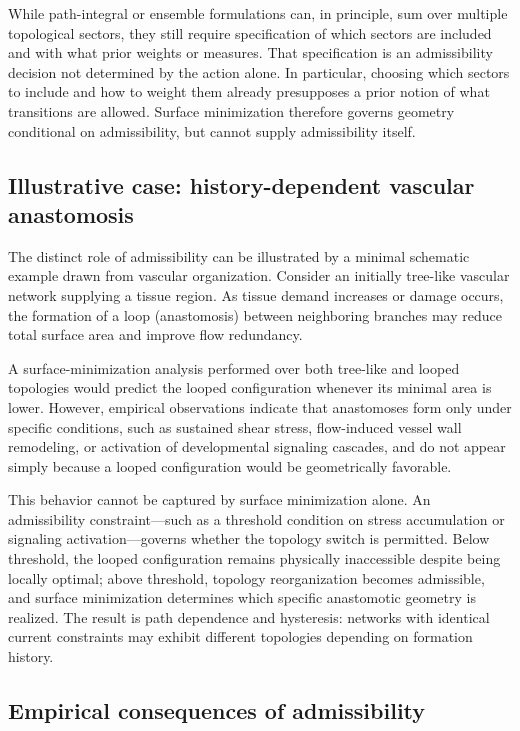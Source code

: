 While path-integral or ensemble formulations can, in principle, sum over multiple topological sectors, they still require specification of which sectors are included and with what prior weights or measures. That specification is an admissibility decision not determined by the action alone. In particular, choosing which sectors to include and how to weight them already presupposes a prior notion of what transitions are allowed. Surface minimization therefore governs geometry conditional on admissibility, but cannot supply admissibility itself.

\subsection{Illustrative case: history-dependent vascular anastomosis}

The distinct role of admissibility can be illustrated by a minimal schematic example drawn from vascular organization. Consider an initially tree-like vascular network supplying a tissue region. As tissue demand increases or damage occurs, the formation of a loop (anastomosis) between neighboring branches may reduce total surface area and improve flow redundancy.

A surface-minimization analysis performed over both tree-like and looped topologies would predict the looped configuration whenever its minimal area is lower. However, empirical observations indicate that anastomoses form only under specific conditions, such as sustained shear stress, flow-induced vessel wall remodeling, or activation of developmental signaling cascades, and do not appear simply because a looped configuration would be geometrically favorable.\cite{Bentley2014}

This behavior cannot be captured by surface minimization alone. An admissibility constraint---such as a threshold condition on stress accumulation or signaling activation---governs whether the topology switch is permitted. Below threshold, the looped configuration remains physically inaccessible despite being locally optimal; above threshold, topology reorganization becomes admissible, and surface minimization determines which specific anastomotic geometry is realized. The result is path dependence and hysteresis: networks with identical current constraints may exhibit different topologies depending on formation history.

\subsection{Empirical consequences of admissibility}


